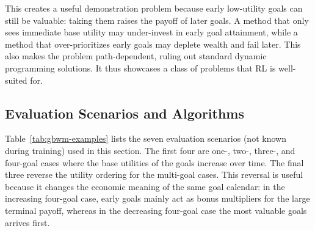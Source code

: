 \documentclass[mnsc,sglanonrev]{informs4}
\begin{document}
This creates a useful demonstration problem because early low-utility goals can still be valuable: taking them raises the payoff of later goals. A method that only sees immediate base utility may under-invest in early goal attainment, while a method that over-prioritizes early goals may deplete wealth and fail later. This also makes the problem path-dependent, ruling out standard dynamic programming solutions. It thus showcases a class of problems that RL is well-suited for. 

\subsection{Evaluation Scenarios and Algorithms}
\label{sec:gbwm-methods}

Table~\ref{tab:gbwm-examples} lists the seven evaluation scenarios (not known during training) used in this section. The first four are one-, two-, three-, and four-goal cases where the base utilities of the goals increase over time. The final three reverse the utility ordering for the multi-goal cases. This reversal is useful because it changes the economic meaning of the same goal calendar: in the increasing four-goal case, early goals mainly act as bonus multipliers for the large terminal payoff, whereas in the decreasing four-goal case the most valuable goals arrives first.
\end{document}
